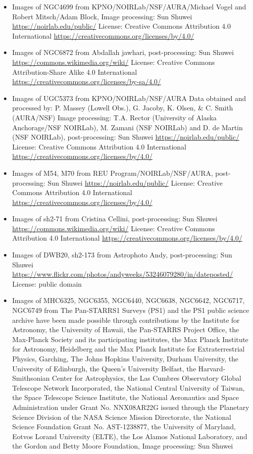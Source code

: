 \begin{itemize}
\item Images of NGC4699
	 from KPNO/NOIRLab/NSF/AURA/Michael Vogel and Robert Mitsch/Adam Block, Image processing: Sun Shuwei
	 \url{https://noirlab.edu/public/}
	 License: Creative Commons Attribution 4.0 International \url{https://creativecommons.org/licenses/by/4.0/}
\item Images of NGC6872
	 from Abdallah jawhari, post-processing: Sun Shuwei
	 \url{https://commons.wikimedia.org/wiki/}
	 License: Creative Commons Attribution-Share Alike 4.0 International \url{https://creativecommons.org/licenses/by-sa/4.0/}
\item Images of UGC5373
	 from KPNO/NOIRLab/NSF/AURA Data obtained and processed by: P. Massey (Lowell Obs.), G. Jacoby, K. Olsen, \& C. Smith (AURA/NSF) Image processing: T.A. Rector (University of Alaska Anchorage/NSF NOIRLab), M. Zamani (NSF NOIRLab) and D. de Martin (NSF NOIRLab), post-processing: Sun Shuwei
	 \url{https://noirlab.edu/public/}
	 License: Creative Commons Attribution 4.0 International \url{https://creativecommons.org/licenses/by/4.0/}
\item Images of M54, M70
	 from REU Program/NOIRLab/NSF/AURA, post-processing: Sun Shuwei
	 \url{https://noirlab.edu/public/}
	 License: Creative Commons Attribution 4.0 International \url{https://creativecommons.org/licenses/by/4.0/}
\item Images of sh2-71
	 from Cristina Cellini, post-processing: Sun Shuwei
	 \url{https://commons.wikimedia.org/wiki/}
	 License: Creative Commons Attribution 4.0 International \url{https://creativecommons.org/licenses/by/4.0/}
\item Images of DWB20, sh2-173
	 from Astrophoto Andy, post-processing: Sun Shuwei
	 \url{https://www.flickr.com/photos/andyweeks/53246079280/in/dateposted/}
	 License: public domain
\item Images of MHC6325, NGC6355, NGC6440, NGC6638, NGC6642, NGC6717, NGC6749
	 from The Pan-STARRS1 Surveys (PS1) and the PS1 public science archive have been made possible through contributions by the Institute for Astronomy, the University of Hawaii, the Pan-STARRS Project Office, the Max-Planck Society and its participating institutes, the Max Planck Institute for Astronomy, Heidelberg and the Max Planck Institute for Extraterrestrial Physics, Garching, The Johns Hopkins University, Durham University, the University of Edinburgh, the Queen's University Belfast, the Harvard-Smithsonian Center for Astrophysics, the Las Cumbres Observatory Global Telescope Network Incorporated, the National Central University of Taiwan, the Space Telescope Science Institute, the National Aeronautics and Space Administration under Grant No. NNX08AR22G issued through the Planetary Science Division of the NASA Science Mission Directorate, the National Science Foundation Grant No. AST-1238877, the University of Maryland, Eotvos Lorand University (ELTE), the Los Alamos National Laboratory, and the Gordon and Betty Moore Foundation, Image processing: Sun Shuwei

\end{itemize}
